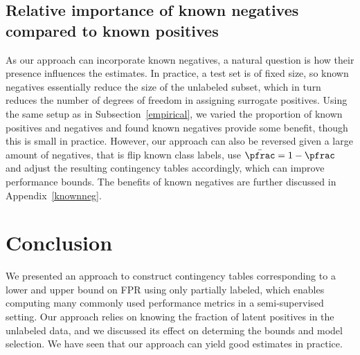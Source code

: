 \subsection{Relative importance of known negatives compared to known positives}
As our approach can incorporate known negatives, a natural question is how their presence influences the estimates. In practice, a test set is of fixed size, so known negatives essentially reduce the size of the unlabeled subset, which in turn reduces the number of degrees of freedom in assigning surrogate positives. Using the same setup as in Subsection~\ref{empirical}, we varied the proportion of known positives and negatives and found known negatives provide some benefit, though this is small in practice. However, our approach can also be reversed given a large amount of negatives, that is flip known class labels, use $\bar{\pfrac}=1-\pfrac$ and adjust the resulting contingency tables accordingly, which can improve performance bounds. The benefits of known negatives are further discussed in Appendix~\ref*{knownneg}.








\section{Conclusion}
We presented an approach to construct contingency tables corresponding to a lower and upper bound on FPR using only partially labeled, which enables computing many commonly used performance metrics in a semi-supervised setting. Our approach relies on knowing the fraction of latent positives in the unlabeled data, and we discussed its effect on determing the bounds and model selection. We have seen that our approach can yield good estimates in practice.  

